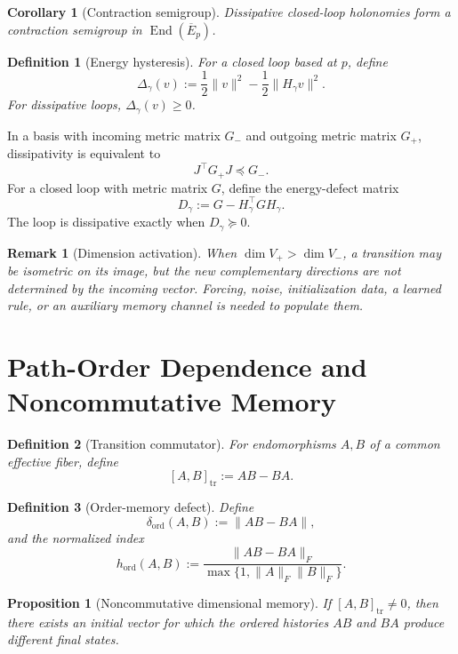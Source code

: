 \documentclass[11pt]{article}
\newtheorem{definition}{Definition}[section]
\newtheorem{proposition}{Proposition}[section]
\newtheorem{corollary}{Corollary}[section]
\newtheorem{remark}{Remark}[section]
\newcommand{\End}{\operatorname{End}}
\begin{document}
\begin{corollary}[Contraction semigroup]
Dissipative closed-loop holonomies form a contraction semigroup in
$\End(\overline E_p)$.
\end{corollary}

\begin{definition}[Energy hysteresis]
For a closed loop based at $p$, define
\[
\Delta_\gamma(v)
:=\frac12\|v\|^2-\frac12\|H_\gamma v\|^2.
\]
For dissipative loops, $\Delta_\gamma(v)\ge0$.
\end{definition}

In a basis with incoming metric matrix $G_-$ and outgoing metric matrix $G_+$,
dissipativity is equivalent to
\[
J^\top G_+J\preceq G_-.
\]
For a closed loop with metric matrix $G$, define the energy-defect matrix
\[
D_\gamma:=G-H_\gamma^\top G H_\gamma.
\]
The loop is dissipative exactly when $D_\gamma\succeq0$.

\begin{remark}[Dimension activation]
When $\dim V_+>\dim V_-$, a transition may be isometric on its image, but the
new complementary directions are not determined by the incoming vector.
Forcing, noise, initialization data, a learned rule, or an auxiliary memory
channel is needed to populate them.
\end{remark}

\section{Path-Order Dependence and Noncommutative Memory}
\label{sec:order}

\begin{definition}[Transition commutator]
For endomorphisms $A,B$ of a common effective fiber, define
\[
[A,B]_{\mathrm{tr}}:=AB-BA.
\]
\end{definition}

\begin{definition}[Order-memory defect]
Define
\[
\delta_{\mathrm{ord}}(A,B):=\|AB-BA\|,
\]
and the normalized index
\[
h_{\mathrm{ord}}(A,B)
:=\frac{\|AB-BA\|_F}
{\max\{1,\|A\|_F\|B\|_F\}}.
\]
\end{definition}

\begin{proposition}[Noncommutative dimensional memory]
If $[A,B]_{\mathrm{tr}}\ne0$, then there exists an initial vector for which
the ordered histories $AB$ and $BA$ produce different final states.
\end{proposition}
\end{document}
